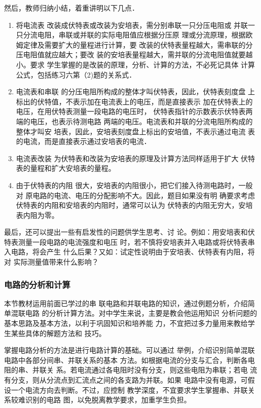 然后，教师归纳小结，着重讲明以下几点．
\begin{enumerate}
\item 将电流表
改装成伏特表或改装为安培表，需分别串联一只分压电阻或
并联一只分流电阻，串联或并联的实际电阻值应根据分压原
理或分流原理，根据欧姆定律及需要扩大的量程进行计算，要
改装的伏特表量程越大，需串联的分压电阻值就应越大；要改
装的安培表量程越大，需并联的分流电阻值就要越小。要求
学生掌握的是改装的原理，分析、计算的方法，不必死记具体
计算公式，包括练习六第（2)题的关系式．
\item 电流表和串联
的分压电阻所构成的整体才叫伏特表，因此，伏特表刻度盘
上标出的伏特值，不表示加在电流表上的电压，而是直接表示
加在伏特表上的电压，在用伏特表测量一段电路的电压时，
伏特表指针的示数表示伏特表两端的电压，也表示待测电路
两端的电压。电流表和并联的分流电阻所构成的整体才叫安
培表，因此，安培表刻度盘上标出的安培值，不表示通过电流
表的电流，而是直接表示通过安培表的电流．
\item 电流表改装
为伏特表和改装为安培表的原理及计算方法同样适用于扩大
伏特表的量程和扩大安培表的量程。
\item 由于伏特表的内阻
很大，安培表的内阻很小，把它们接入待测电路时，一般对
原电路的电流、电压的分配影响不大。因此，题目如果没有明
确要求考虑伏特表的内阻和安培表的内阻时，通常可以认为
伏特表的内阻无穷大，安培表内阻为零。
\end{enumerate}

最后，还可以提出一些有启发性的问题供学生思考、讨
论。例如：用安培表和伏特表测量一段电路的电流强度和电压
时，若不慎将安培表并入电路或将伏特表串入电路，将会产生
什么后果？又如：试定性说明由于安培表、伏特表有内阻，将对
实际测量值带来什么影响？

\subsubsection{电路的分析和计算}

本节教材运用前面已学过的串
联电路和并联电路的知识，通过例题分析，介绍简单混联电路
的分析计算方法。对中学生来说，主要是教会他运用知识
分析问题的基本思路及基本方法，以利于巩固知识和培养能
力，不宜把过多力量用来教给学生某些具体的解题方法和
技巧。

掌握电路分析的方法是进行电路计算的基础。可以通过
举例，介绍识别简单混联电路中各部分间串、并联关系的基本
方法。如根据电流的分支与汇合，判断各电阻的串、并联关
系。若电流通过各电阻时没有分支，则这些电阻为串联；若电
流有分支，则从分流点到汇流点之间的各支路为并联。如果
电路中没有电源，可假设一个电流方向去判断。不过，应控制
教学深度，不宜要求学生掌握串、并联关系较难识别的电路
图，以免脱离教学要求，加重学生负担。

